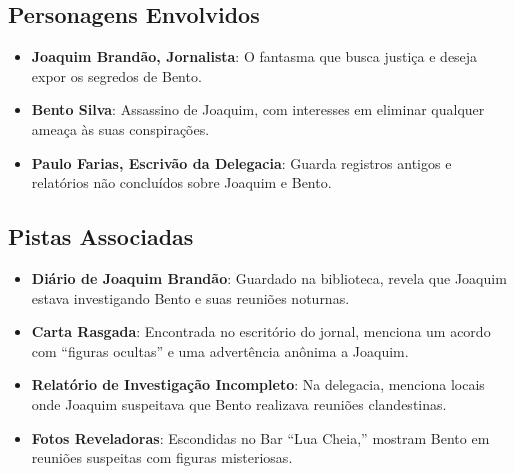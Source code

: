 \subsection{Personagens Envolvidos}
\begin{itemize}
    \item \textbf{Joaquim Brandão, Jornalista}: O fantasma que busca justiça e deseja expor os segredos de Bento.
    \item \textbf{Bento Silva}: Assassino de Joaquim, com interesses em eliminar qualquer ameaça às suas conspirações.
    \item \textbf{Paulo Farias, Escrivão da Delegacia}: Guarda registros antigos e relatórios não concluídos sobre Joaquim e Bento.
\end{itemize}

\subsection{Pistas Associadas}
\begin{itemize}
    \item \textbf{Diário de Joaquim Brandão}: Guardado na biblioteca, revela que Joaquim estava investigando Bento e suas reuniões noturnas.
    \item \textbf{Carta Rasgada}: Encontrada no escritório do jornal, menciona um acordo com “figuras ocultas” e uma advertência anônima a Joaquim.
    \item \textbf{Relatório de Investigação Incompleto}: Na delegacia, menciona locais onde Joaquim suspeitava que Bento realizava reuniões clandestinas.
    \item \textbf{Fotos Reveladoras}: Escondidas no Bar “Lua Cheia,” mostram Bento em reuniões suspeitas com figuras misteriosas.
\end{itemize}


